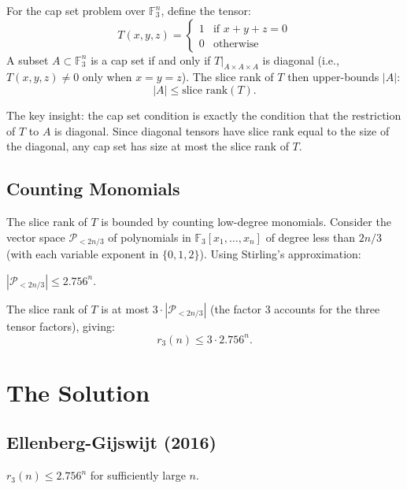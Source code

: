 For the cap set problem over $\mathbb{F}_3^n$, define the tensor:
\[
T(x,y,z) = \begin{cases} 1 & \text{if } x + y + z = 0 \\ 0 & \text{otherwise} \end{cases}
\]
A subset $A \subset \mathbb{F}_3^n$ is a cap set if and only if $T|_{A \times A \times A}$ is diagonal (i.e., $T(x,y,z) \neq 0$ only when $x = y = z$). The slice rank of $T$ then upper-bounds $|A|$:
\[
|A| \le \text{slice rank}(T).
\]

\begin{highlightbox}
The key insight: the cap set condition is exactly the condition that the restriction of $T$ to $A$ is diagonal. Since diagonal tensors have slice rank equal to the size of the diagonal, any cap set has size at most the slice rank of $T$.
\end{highlightbox}

\subsection{Counting Monomials}

The slice rank of $T$ is bounded by counting low-degree monomials. Consider the vector space $\mathcal{P}_{<2n/3}$ of polynomials in $\mathbb{F}_3[x_1, \ldots, x_n]$ of degree less than $2n/3$ (with each variable exponent in $\{0, 1, 2\}$). Using Stirling's approximation:

\begin{theorem}
$|\mathcal{P}_{<2n/3}| \le 2.756^n$.
\end{theorem}

The slice rank of $T$ is at most $3 \cdot |\mathcal{P}_{<2n/3}|$ (the factor 3 accounts for the three tensor factors), giving:
\[
r_3(n) \le 3 \cdot 2.756^n.
\]

\section{The Solution}

\subsection{Ellenberg-Gijswijt (2016)}

\begin{theorem}
$r_3(n) \le 2.756^n$ for sufficiently large $n$.
\end{theorem}

